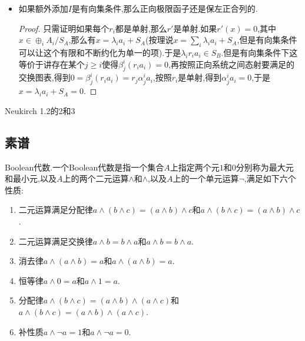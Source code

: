 \begin{enumerate}
\begin{itemize}
\begin{proof}
			$\mathrm{im}r'\subset\ker s'$是函子性直接保证的.最后验证$\ker s'\subset\mathrm{im}r'$:假设$(b_i)\in\ker s'\subset\oplus_iB_i/S_B$,那么$(s_ib_i)\in S_B$,于是$(s_ib_i)$可以表示为某些$\lambda_j\beta^i_jb_i-\lambda_ib_i$的基域上的线性组合,记作$(s_ib_i)=\sum k_{p,q}(\lambda_q\gamma_p^qc_p-\lambda_pc_p)$.按照$s_i$都是满射,存在$b_p\in B_p$使得$s_i(b_p)=c_p$,于是$(s_ib_i)=\sum k_{p,q}(\lambda_q\gamma_p^qs_pb_p-\lambda_ps_pb_p)$.按照之前的交换图表,有$\gamma_p^qs_p=s_q\beta_p^q$.于是有$(s_ib_i)=\sum k_{p,q}(\lambda_qs_q\beta_p^qb_p'-\lambda_ps_pb_p')=(s_i)\sum k_{p,q}(\lambda_q\beta_p^qb_p'-\lambda_pb_p')$,于是$(b_i)-\sum k_{p,q}(\lambda_q\beta_p^qb_p'-\lambda_pb_p')$落在$\ker\oplus_is_i=\mathrm{im}\oplus_ir_i$中,于是这个差可以表示为$(r_ia_i)$,其中$(a_i)\in\oplus_iA_i$.于是$(b_i)\in\mathrm{im}\oplus_iA_i+S_B$,这说明$\ker s'\subset\mathrm{im}r'$.
		\end{proof}
		\item 如果额外添加$I$是有向集条件,那么正向极限函子还是保左正合列的.
		\begin{proof}
			
			只需证明如果每个$r_i$都是单射,那么$r'$是单射.如果$r'(x)=0$,其中$x\in\oplus_iA_i/S_A$,那么有$x=\lambda_ia_i+S_A$(按理说$x=\sum_i\lambda_ia_i+S_A$,但是有向集条件可以让这个有限和不断约化为单一的项).于是$\lambda_ir_ia_i\in S_B$.但是有向集条件下这等价于讲存在某个$j\ge i$使得$\beta_j^i(r_ia_i)=0$,再按照正向系统之间态射要满足的交换图表,得到$0=\beta_j^i(r_ia_i)=r_j\alpha_j^ia_i$,按照$r_i$是单射,得到$\alpha_j^ia_i=0$,于是$x=\lambda_ia_i+S_A=0$.
		\end{proof}
	\end{itemize}
\end{enumerate}


Neukirch
1.2的2和3



\subsection{素谱}



Boolean代数.一个Boolean代数是指一个集合$A$上指定两个元$1$和$0$分别称为最大元和最小元,以及$A$上的两个二元运算$\land$和$\wedge$,以及$A$上的一个单元运算$\neg$,满足如下六个性质:
\begin{enumerate}
	\item 二元运算满足分配律$a\land(b\land c)=(a\land b)\land c$和$a\wedge(b\wedge c)=(a\wedge b)\wedge c$.
	\item 二元运算满足交换律$a\land b=b\land a$和$a\wedge b=b\wedge a$.
	\item 消去律$a\land(a\wedge b)=a$和$a\wedge(a\land b)=a$.
	\item 恒等律$a\land 0=a$和$a\wedge 1=a$.
	\item 分配律$a\wedge(b\land c)=(a\wedge b)\land(a\wedge c)$和$a\land(b\wedge c)=(a\land b)\wedge(a\land c)$.
	\item 补性质$a\land\neg a=1$和$a\wedge\neg a=0$.
\end{enumerate}

